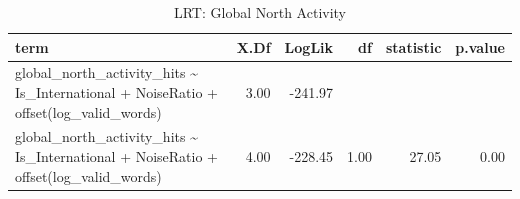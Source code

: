 \begin{table}[ht]
\centering
\begin{tabular}{lrrrrr}
  \hline
term & X.Df & LogLik & df & statistic & p.value \\ 
  \hline
global\_north\_activity\_hits \~{} Is\_International + NoiseRatio + offset(log\_valid\_words) & 3.00 & -241.97 &  &  &  \\ 
  global\_north\_activity\_hits \~{} Is\_International + NoiseRatio + offset(log\_valid\_words) & 4.00 & -228.45 & 1.00 & 27.05 & 0.00 \\ 
   \hline
\end{tabular}
\caption{LRT: Global North Activity} 
\end{table}
